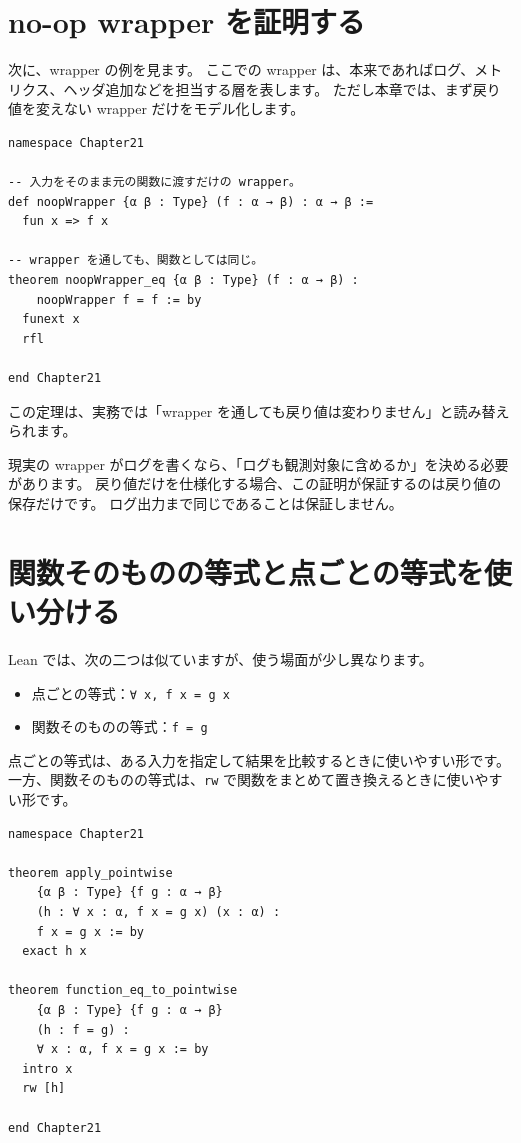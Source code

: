 \section{no-op wrapper を証明する}

次に、wrapper の例を見ます。
ここでの wrapper は、本来であればログ、メトリクス、ヘッダ追加などを担当する層を表します。
ただし本章では、まず戻り値を変えない wrapper だけをモデル化します。

\begin{listing}[htbp]
\begin{verbatim}
namespace Chapter21

-- 入力をそのまま元の関数に渡すだけの wrapper。
def noopWrapper {α β : Type} (f : α → β) : α → β :=
  fun x => f x

-- wrapper を通しても、関数としては同じ。
theorem noopWrapper_eq {α β : Type} (f : α → β) :
    noopWrapper f = f := by
  funext x
  rfl

end Chapter21
\end{verbatim}
\caption{\texttt{noopWrapper\_eq}}
\label{lst:ch21-noop-wrapper}
\end{listing}

この定理は、実務では「wrapper を通しても戻り値は変わりません」と読み替えられます。

現実の wrapper がログを書くなら、「ログも観測対象に含めるか」を決める必要があります。
戻り値だけを仕様化する場合、この証明が保証するのは戻り値の保存だけです。
ログ出力まで同じであることは保証しません。

\section{関数そのものの等式と点ごとの等式を使い分ける}

Lean では、次の二つは似ていますが、使う場面が少し異なります。

\begin{itemize}
\item 点ごとの等式：\texttt{∀ x, f x = g x}
\item 関数そのものの等式：\texttt{f = g}
\end{itemize}

点ごとの等式は、ある入力を指定して結果を比較するときに使いやすい形です。
一方、関数そのものの等式は、\texttt{rw} で関数をまとめて置き換えるときに使いやすい形です。

\begin{listing}[htbp]
\begin{verbatim}
namespace Chapter21

theorem apply_pointwise
    {α β : Type} {f g : α → β}
    (h : ∀ x : α, f x = g x) (x : α) :
    f x = g x := by
  exact h x

theorem function_eq_to_pointwise
    {α β : Type} {f g : α → β}
    (h : f = g) :
    ∀ x : α, f x = g x := by
  intro x
  rw [h]

end Chapter21
\end{verbatim}
\caption{\texttt{apply\_pointwise} と \texttt{function\_eq\_to\_pointwise}}
\label{lst:ch21-pointwise-vs-function}
\end{listing}

